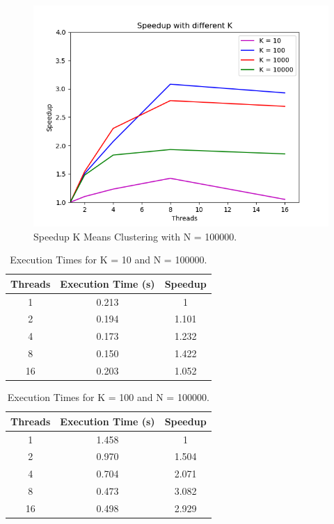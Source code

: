 \documentclass[10pt,twocolumn,letterpaper]{article}
\begin{document}
\begin{figure}[H]
	\includegraphics[width=\linewidth]{images/speedup_by_k.png}
	\caption{Speedup K Means Clustering with N = 100000.}
	\label{fig:speedup_k}
\end{figure}

\begin{table}[H]
	\begin{center}
		\begin{tabular}{|c|c|c|}
			\hline
			Threads & Execution Time (s) & Speedup \\
			\hline
			1 & 0.213 & 1 \\ 
			2 & 0.194 & 1.101 \\
			4 & 0.173 & 1.232 \\
			8 & 0.150 & 1.422 \\ 
			16 & 0.203 & 1.052 \\
			\hline
		\end{tabular}
	\end{center}
	\caption{Execution Times for K = 10 and N = 100000.}
	\label{tab:speedup_k_n_1}
\end{table}

\begin{table}[H]
	\begin{center}
		\begin{tabular}{|c|c|c|}
			\hline
			Threads & Execution Time (s) & Speedup \\
			\hline
			1 & 1.458 & 1 \\ 
			2 & 0.970 & 1.504 \\
			4 & 0.704 & 2.071 \\
			8 & 0.473 & 3.082 \\ 
			16 & 0.498 & 2.929 \\
			\hline
		\end{tabular}
	\end{center}
	\caption{Execution Times for K = 100 and N = 100000.}
	\label{tab:speedup_k_n_2}
\end{table}
\end{document}
